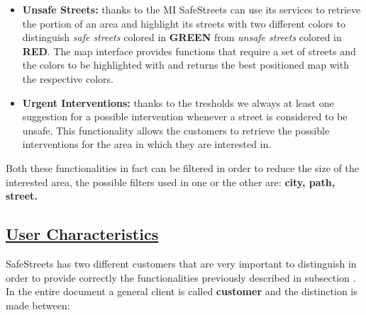 		 \begin{itemize}
		 	\item \textbf{Unsafe Streets:} thanks to the MI SafeStreets can use its services to retrieve the portion of an area and highlight its streets with two different colors to distinguish \emph{safe streets} colored in \textbf{GREEN} from \emph{unsafe streets} colored in \textbf{RED}. The map interface provides functions that require a set of streets and the colors to be highlighted with and returns the best positioned map with the respective colors. 
		 	
		 	\item \textbf{Urgent Interventions:} thanks to the tresholds we always at least one suggestion for a possible intervention whenever a street is considered to be unsafe. This functionality allows the customers to retrieve the possible interventions for the area in which they are interested in.
		 \end{itemize}
	 
	 	Both these functionalities in fact can be filtered in order to reduce the size of the interested area, the possible filters used in one or the other are: \textbf{city, path, street.}
		
\subsection[User Characteristics]{\hyperlink{toc}{User Characteristics}}
	\label{sec:userCharacteristics}
	SafeStreets has two different customers that are very important to distinguish in order to provide correctly the functionalities previously described in subsection . In the entire document a general client is called \textbf{customer} and the distinction is made between:
	
